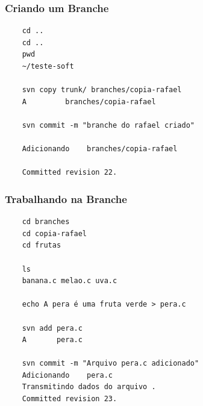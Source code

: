 \documentclass{beamer}
\begin{document}
\begin{frame}[fragile]
    \frametitle{Criando um Branche}

    \begin{bash}{}
        {\tiny
            \begin{verbatim}
    cd ..
    cd ..
    pwd
    ~/teste-soft

    svn copy trunk/ branches/copia-rafael
    A         branches/copia-rafael

    svn commit -m "branche do rafael criado"

    Adicionando    branches/copia-rafael

    Committed revision 22.
    \end{verbatim}
}
    \end{bash}

\end{frame}


\begin{frame}[fragile]
    \frametitle{Trabalhando na Branche}

    \begin{bash}{}
        {\tiny
            \begin{verbatim}
    cd branches
    cd copia-rafael
    cd frutas

    ls
    banana.c melao.c uva.c

    echo A pera é uma fruta verde > pera.c

    svn add pera.c
    A       pera.c

    svn commit -m "Arquivo pera.c adicionado"
    Adicionando    pera.c
    Transmitindo dados do arquivo .
    Committed revision 23.
    \end{verbatim}
}
    \end{bash}

\end{frame}
\end{document}
